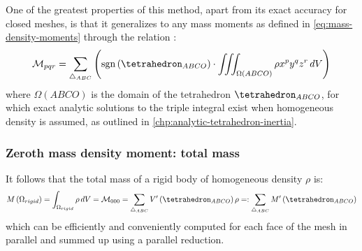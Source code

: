 \documentclass[oneside, a4paper]{book}
\newcommand\br[1]{\left(#1\right)}
\DeclareMathOperator{\sgn}{sgn}
\begin{document}
    One of the greatest properties of this method, apart from its exact accuracy for closed meshes, is that it generalizes to any mass moments as defined in \autoref{eq:mass-density-moments} through the relation \autocite{efficient-feature-extraction}:
    \begin{equation}\label{eq:mass-density-moments-using-signed-volume}
      \mathcal{M}_{pqr} = \sum_{\triangle_{ABC}} \br{\sgn\br{\tetrahedron_{ABCO}} \cdot \iiint_{\Omega\br{ABCO}} \rho x^p y^q z^r  \,dV}
    \end{equation}
    where $\Omega\br{ABCO}$ is the domain of the tetrahedron $\tetrahedron_{ABCO}$, for which exact analytic solutions to the triple integral exist when homogeneous density is assumed, as outlined in \autoref{chp:analytic-tetrahedron-inertia}.
    
    
    
    
    \subsubsection{Zeroth mass density moment: total mass}
    It follows that the total mass of a rigid body of homogeneous density $\rho$ is:
    \begin{equation}\label{eq:total-rigid-body-mass}
      M\br{\Omega_{rigid}} = \int_{\Omega_{rigid}} \rho \,dV= \mathcal{M}_{000}  = \sum_{\triangle_{ABC}} V'\br{\tetrahedron_{ABCO}} \rho  =:  \sum_{\triangle_{ABC}} M'\br{\tetrahedron_{ABCO}}
    \end{equation}
    which can be efficiently and conveniently computed for each face of the mesh in parallel and summed up using a parallel reduction.
\end{document}
